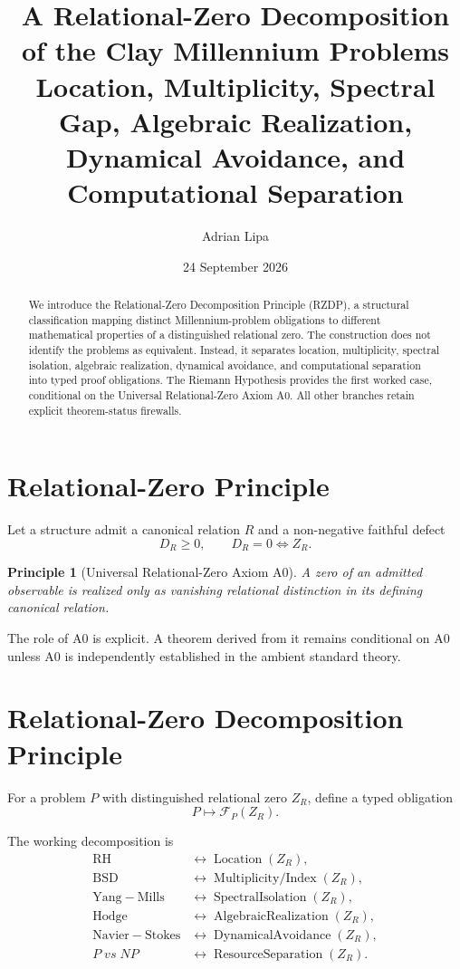 \documentclass[11pt]{article}
\title{\textbf{A Relational-Zero Decomposition of the Clay Millennium Problems}\\
\large Location, Multiplicity, Spectral Gap, Algebraic Realization, Dynamical Avoidance, and Computational Separation}
\author{Adrian Lipa}
\date{24 September 2026}
\newtheorem{principle}{Principle}
\begin{document}
\maketitle

\begin{abstract}
We introduce the Relational-Zero Decomposition Principle (RZDP), a structural classification mapping distinct Millennium-problem obligations to different mathematical properties of a distinguished relational zero. The construction does not identify the problems as equivalent. Instead, it separates location, multiplicity, spectral isolation, algebraic realization, dynamical avoidance, and computational separation into typed proof obligations. The Riemann Hypothesis provides the first worked case, conditional on the Universal Relational-Zero Axiom A0. All other branches retain explicit theorem-status firewalls.
\end{abstract}

\section{Relational-Zero Principle}

Let a structure admit a canonical relation \(R\) and a non-negative faithful defect
\[
D_R\ge 0,\qquad D_R=0\Longleftrightarrow Z_R.
\]

\begin{principle}[Universal Relational-Zero Axiom A0]
A zero of an admitted observable is realized only as vanishing relational distinction in its defining canonical relation.
\end{principle}

The role of A0 is explicit. A theorem derived from it remains conditional on A0 unless A0 is independently established in the ambient standard theory.

\section{Relational-Zero Decomposition Principle}

For a problem \(P\) with distinguished relational zero \(Z_R\), define a typed obligation
\[
P\longmapsto\mathcal F_P(Z_R).
\]

The working decomposition is
\[
\begin{aligned}
\mathrm{RH} &\longleftrightarrow \operatorname{Location}(Z_R),\\
\mathrm{BSD} &\longleftrightarrow \operatorname{Multiplicity/Index}(Z_R),\\
\mathrm{Yang\!-\!Mills} &\longleftrightarrow \operatorname{SpectralIsolation}(Z_R),\\
\mathrm{Hodge} &\longleftrightarrow \operatorname{AlgebraicRealization}(Z_R),\\
\mathrm{Navier\!-\!Stokes} &\longleftrightarrow \operatorname{DynamicalAvoidance}(Z_R),\\
P\;vs\;NP &\longleftrightarrow \operatorname{ResourceSeparation}(Z_R).
\end{aligned}
\]
\end{document}

